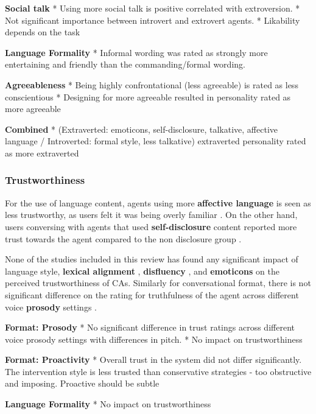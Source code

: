 \textbf{Social talk}
* Using more social talk is positive correlated with extroversion. \cite{volkel2021manipulating}\cmt{[68]}
* Not significant importance between introvert and extrovert agents. \cite{roy2021users}\cmt{[71]}
* Likability depends on the task \cite{haas2022keep}\cmt{[78]}

\textbf{Language Formality}
* Informal wording was rated as strongly more entertaining and friendly than the commanding/formal wording. \cite{jestin2022effects}\cmt{[81]}

\textbf{Agreeableness}
* Being highly confrontational (less agreeable) is rated as less conscientious \cite{volkel2021manipulating}\cmt{[68]}
* Designing for more agreeable resulted in personality rated as more agreeable \cite{volkel2021examining}\cmt{[69]}

\textbf{Combined}
* (Extraverted: emoticons, self-disclosure, talkative, affective language / Introverted: formal style, less talkative) extraverted personality rated as more extraverted \cite{volkel2022user}\cmt{[75]}

\subsubsection{Trustworthiness}

For the use of language content, agents using more \textbf{affective language} is seen as less trustworthy, as users felt it was being overly familiar \cite{andrews2012system}\cmt{[38]}. On the other hand, users conversing with agents that used \textbf{self-disclosure} content reported more trust towards the agent compared to the non disclosure group \cite{lee2020hear}\cmt{[23]}.

None of the studies included in this review has found any significant impact of language style, \textbf{lexical alignment} \cite{hoegen2019end}\cmt{[31]}\cite{huiyang2022improving}\cmt{[17]}\cite{linnemann2018can}\cmt{[15]}, \textbf{disfluency} \cite{pfeifer2009should}\cmt{[12]}, and \textbf{emoticons} \cite{wilhelm2022keep}\cmt{[28]} on the perceived trustworthiness of CAs. Similarly for conversational format, there is not significant difference on the rating for truthfulness of the agent across different voice \textbf{prosody} settings \cite{dubiel2020persuasive}\cmt{[60]}.

\textbf{Format: Prosody}
* No significant difference in trust ratings across different voice prosody settings with differences in pitch. \cite{tolmeijer2021female}\cmt{[62]}
* No impact on trustworthiness  \cite{jestin2022effects}\cmt{[81]}

\textbf{Format: Proactivity}
* Overall trust in the system did not differ significantly. The intervention style is less trusted than conservative strategies - too obstructive and imposing. Proactive should be subtle  \cite{kraus2020effects}\cmt{[64]}

\textbf{Language Formality}
* No impact on trustworthiness \cite{jestin2022effects}\cmt{[81]}

